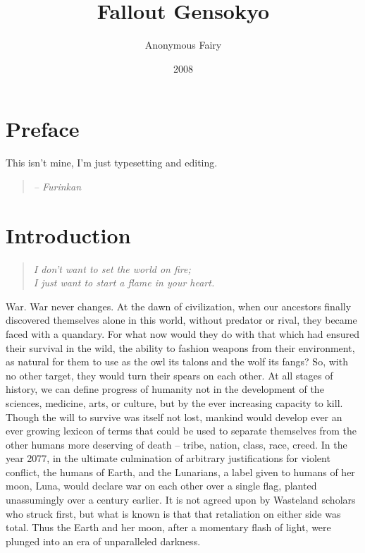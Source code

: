 \documentclass[a4paper,12pt]{book}
\begin{document}
\frontmatter


\title{Fallout Gensokyo}
\author{Anonymous Fairy}
\date{2008}
\maketitle


\chapter{Preface}

This isn't mine, I'm just typesetting and editing.

\begin{quote}
\emph{-- Furinkan}
\end{quote}

\mainmatter

\chapter{Introduction}

\begin{quote}
\emph{I don't want to set the world on fire;\\
I just want to start a flame in your heart.}
\end{quote}


War. War never changes. At the dawn of civilization, when our ancestors finally discovered themselves alone in this world, without predator or rival, they became faced with a quandary. For what now would they do with that which had ensured their survival in the wild, the ability to fashion weapons from their environment, as natural for them to use as the owl its talons and the wolf its fangs? So, with no other target, they would turn their spears on each other. At all stages of history, we can define progress of humanity not in the development of the sciences, medicine, arts, or culture, but by the ever increasing capacity to kill. Though the will to survive was itself not lost, mankind would develop ever an ever growing lexicon of terms that could be used to separate themselves from the other humans more deserving of death -- tribe, nation, class, race, creed. In the year 2077, in the ultimate culmination of arbitrary justifications for violent conflict, the humans of Earth, and the Lunarians, a label given to humans of her moon, Luna, would declare war on each other over a single flag, planted unassumingly over a century earlier. It is not agreed upon by Wasteland scholars who struck first, but what is known is that that retaliation on either side was total. Thus the Earth and her moon, after a momentary flash of light, were plunged into an era of unparalleled darkness.
\end{document}
